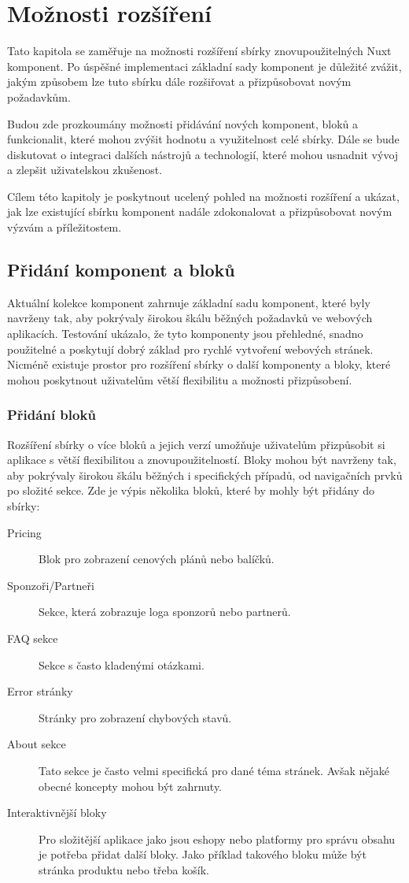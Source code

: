 
\chapter{Možnosti rozšíření}

Tato kapitola se zaměřuje na možnosti rozšíření sbírky znovupoužitelných Nuxt komponent. Po úspěšné implementaci základní sady komponent je důležité zvážit, jakým způsobem lze tuto sbírku dále rozšiřovat a přizpůsobovat novým požadavkům.

Budou zde prozkoumány možnosti přidávání nových komponent, bloků a funkcionalit, které mohou zvýšit hodnotu a využitelnost celé sbírky. Dále se bude diskutovat o integraci dalších nástrojů a technologií, které mohou usnadnit vývoj a zlepšit uživatelskou zkušenost.

Cílem této kapitoly je poskytnout ucelený pohled na možnosti rozšíření a ukázat, jak lze existující sbírku komponent nadále zdokonalovat a přizpůsobovat novým výzvám a příležitostem.

\section{Přidání komponent a bloků}
Aktuální kolekce komponent zahrnuje základní sadu komponent, které byly navrženy tak, aby pokrývaly širokou škálu běžných požadavků ve webových aplikacích. Testování ukázalo, že tyto komponenty jsou přehledné, snadno použitelné a poskytují dobrý základ pro rychlé vytvoření webových stránek. Nicméně existuje prostor pro rozšíření sbírky o další komponenty a bloky, které mohou poskytnout uživatelům větší flexibilitu a možnosti přizpůsobení.

\subsection{Přidání bloků}
Rozšíření sbírky o více bloků a jejich verzí umožňuje uživatelům přizpůsobit si aplikace s větší flexibilitou a znovupoužitelností. Bloky mohou být navrženy tak, aby pokrývaly širokou škálu běžných i specifických případů, od navigačních prvků po složité sekce. Zde je výpis několika bloků, které by mohly být přidány do sbírky:

\begin{description}
  \item[Pricing] Blok pro zobrazení cenových plánů nebo balíčků.
  \item[Sponzoři/Partneři] Sekce, která zobrazuje loga sponzorů nebo partnerů.
  \item[FAQ sekce] Sekce s často kladenými otázkami.
  \item[Error stránky] Stránky pro zobrazení chybových stavů.
  \item[About sekce] Tato sekce je často velmi specifická pro dané téma stránek. Avšak nějaké obecné koncepty mohou být zahrnuty.
  \item[Interaktivnější bloky] Pro složitější aplikace jako jsou eshopy nebo platformy pro správu obsahu je potřeba přidat další bloky. Jako příklad takového bloku může být stránka produktu nebo třeba košík.
\end{description}

